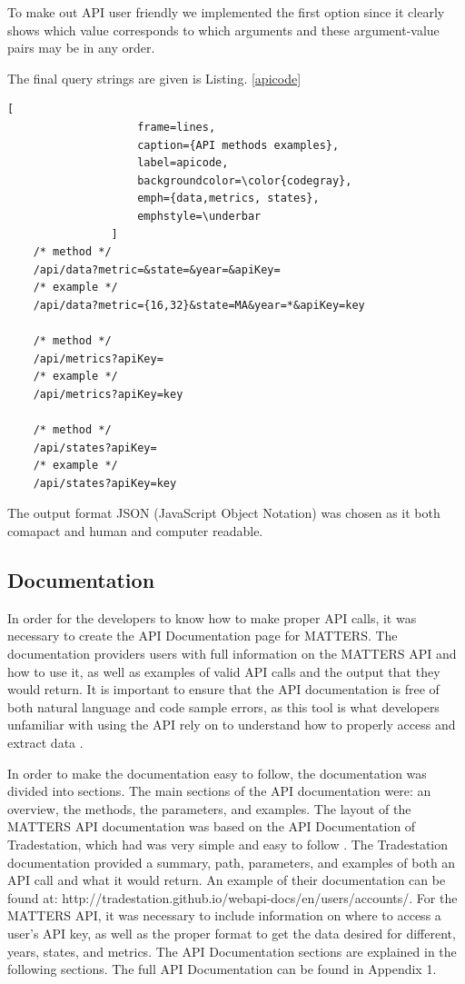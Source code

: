 				To make out API user friendly we implemented the first option since it clearly 
				shows which value corresponds to which arguments and these argument-value pairs may be in any order.
				
				The final query strings are given is Listing. \ref{apicode}
				
				\begin{lstlisting}[
					frame=lines,
					caption={API methods examples}, 
					label=apicode, 
					backgroundcolor=\color{codegray}, 
					emph={data,metrics, states},
					emphstyle=\underbar
				]
	/* method */
	/api/data?metric=&state=&year=&apiKey=
	/* example */
	/api/data?metric={16,32}&state=MA&year=*&apiKey=key

	/* method */
	/api/metrics?apiKey=
	/* example */
	/api/metrics?apiKey=key

	/* method */
	/api/states?apiKey=
	/* example */
	/api/states?apiKey=key
				\end{lstlisting}
				
				The output format JSON (JavaScript Object Notation) was chosen
				as it both comapact and human and computer readable. 
				
			\subsection{Documentation}
				
				In order for the developers to know how to make proper API calls, 
				it was necessary to create the API Documentation page for MATTERS. 
				The documentation providers users with full information on the MATTERS API 
				and how to use it, as well as examples of valid API calls and the output 
				that they would return. It is important to ensure that the API documentation 
				is free of both natural language and code sample errors, as this tool is 
				what developers unfamiliar with using the API rely on to understand how 
				to properly access and extract data \cite{errors}. 
				
				In order to make the documentation easy to follow, the documentation was divided into sections. 
				The main sections of the API documentation were: an overview, the methods, 
				the parameters, and examples. The layout of the MATTERS API documentation was based on the 
				API Documentation of Tradestation, which had was very simple and easy to follow \cite{apiex}. 
				The Tradestation documentation provided a summary, path, parameters, and examples of both an 
				API call and what it would return. An example of their documentation can be found at: 
				http://tradestation.github.io/webapi-docs/en/users/accounts/. For the MATTERS API, 
				it was necessary to include information on where to access a user’s API key, 
				as well as the proper format to get the data desired for different, years, states, 
				and metrics. The API Documentation sections are explained in the following sections. 
				The full API Documentation can be found in Appendix 1.
				
